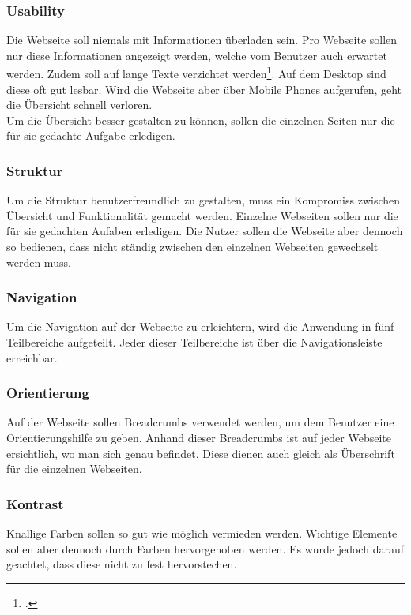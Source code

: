 \subsubsection*{Usability}
Die Webseite soll niemals mit Informationen überladen sein. Pro Webseite sollen nur diese Informationen angezeigt werden, welche vom Benutzer auch erwartet werden. Zudem soll auf lange Texte verzichtet werden\footcite{usability}. Auf dem Desktop sind diese oft gut lesbar. Wird die Webseite aber über Mobile Phones aufgerufen, geht die Übersicht schnell verloren. \\

Um die Übersicht besser gestalten zu können, sollen die einzelnen Seiten nur die für sie gedachte Aufgabe erledigen.

\subsubsection*{Struktur}
Um die Struktur benutzerfreundlich zu gestalten, muss ein Kompromiss zwischen Übersicht und Funktionalität gemacht werden. Einzelne Webseiten sollen nur die für sie gedachten Aufaben erledigen. Die Nutzer sollen die Webseite aber dennoch so bedienen, dass nicht ständig zwischen den einzelnen Webseiten gewechselt werden muss.

		
\subsubsection*{Navigation}
Um die Navigation auf der Webseite zu erleichtern, wird die Anwendung in fünf Teilbereiche aufgeteilt. Jeder dieser Teilbereiche ist über die Navigationsleiste erreichbar. 
		
\subsubsection*{Orientierung}
Auf der Webseite sollen Breadcrumbs verwendet werden, um dem Benutzer eine Orientierungshilfe zu geben. Anhand dieser Breadcrumbs ist auf jeder Webseite ersichtlich, wo man sich genau befindet. Diese dienen auch gleich als Überschrift für die einzelnen Webseiten.

\subsubsection*{Kontrast}
Knallige Farben sollen so gut wie möglich vermieden werden. Wichtige Elemente sollen aber dennoch durch Farben hervorgehoben werden. Es wurde jedoch darauf geachtet, dass diese nicht zu fest hervorstechen.


